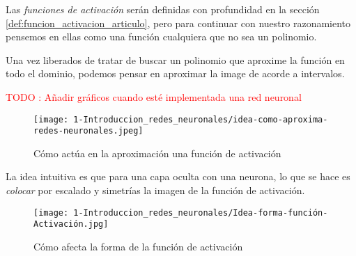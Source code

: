 Las \textit{funciones de activación} serán definidas con profundidad en la sección 
\ref{def:funcion_activacion_articulo}, pero para continuar con nuestro razonamiento 
pensemos en ellas como una función cualquiera que no sea un polinomio. 

Una vez liberados de tratar de buscar un polinomio que aproxime la función en todo
el dominio, podemos pensar en aproximar la image de acorde a intervalos.  
 
\textcolor{red}{TODO : Añadir gráficos cuando esté implementada una red neuronal}

\begin{figure}[h!]
    \texttt{[image: 1-Introduccion\_redes\_neuronales/idea-como-aproxima-redes-neuronales.jpeg]}
    \caption{Cómo actúa en la aproximación una función de activación}
    \label{img:idea-como-aproxima-redes-neuronales}
   \end{figure}

La idea intuitiva es que para una capa oculta con una neurona, 
lo que se hace es \textit{colocar} por escalado y simetrías la imagen de la función de activación. 

\begin{figure}[h!]
    \texttt{[image: 1-Introduccion\_redes\_neuronales/Idea-forma-función-Activación.jpg]}
    \caption{Cómo afecta la forma de la función de activación}
    \label{img:como afecta la forma de la función de aproximación}
\end{figure}
